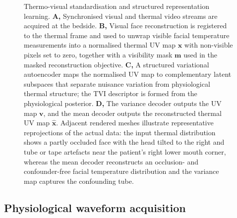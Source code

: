 \documentclass[11pt]{article}
\begin{document}
\begin{figure}[htbp]
%
  \caption{Thermo-visual standardisation and structured representation learning.
    \textbf{A,} Synchronised visual and thermal video streams are acquired at
    the bedside. \textbf{B,} Visual face reconstruction is registered to the
    thermal frame and used to unwrap visible facial temperature measurements
    into a normalised thermal UV map $\mathbf{x}$ with non-visible pixels set
    to zero, together with a visibility mask $\mathbf{m}$ used in the masked
    reconstruction objective. \textbf{C,} A structured variational
    autoencoder maps the normalised UV map to complementary latent subspaces
    that separate nuisance variation from physiological thermal structure; the
    TVI descriptor is formed from the physiological posterior. \textbf{D,} The variance decoder outputs the UV map
    $\mathbf{v}$, and the mean decoder outputs the reconstructed thermal UV map
    $\hat{\mathbf{x}}$. Adjacent rendered meshes illustrate representative
    reprojections of the actual data: the input thermal distribution shows a
    partly occluded face with the head tilted to the right and tube or tape
    artefacts near the patient's right lower mouth corner, whereas the mean
    decoder reconstructs an occlusion- and confounder-free facial temperature
  distribution and the variance map captures the confounding tube.}
  \label{fig:thermal-pipeline-vae}
\end{figure}

\subsection*{Physiological waveform acquisition}
\end{document}
